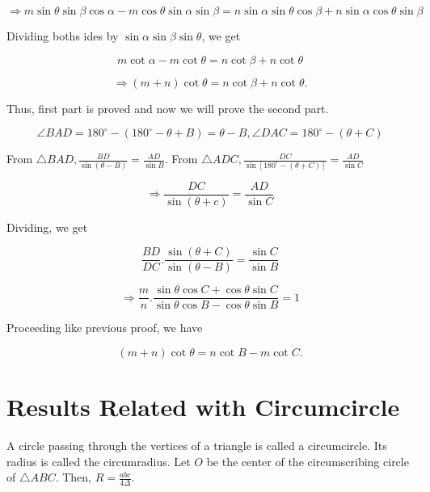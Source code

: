   $$\Rightarrow m\sin\theta\sin\beta\cos\alpha - m\cos\theta\sin\alpha\sin\beta = n\sin\alpha\sin\theta\cos\beta +
  n\sin\alpha\cos\theta\sin\beta$$

  Dividing boths ides by $\sin\alpha\sin\beta\sin\theta$, we get

  $$m\cot\alpha - m\cot\theta = n\cot\beta + n\cot\theta$$

  $$\Rightarrow (m + n)\cot\theta = n\cot\beta + n\cot\theta.$$

  \noindent Thus, first part is proved and now we will prove the second part.

  $$\angle BAD = 180^\circ - (180^\circ - \theta + B) = \theta - B, \angle DAC = 180^\circ - (\theta + C)$$

  From $\triangle BAD, \frac{BD}{\sin(\theta - B)} = \frac{AD}{\sin B}$. From $\triangle ADC, \frac{DC}{\sin[180^\circ - (\theta +
      C)]} = \frac{AD}{\sin C}$

  $$\Rightarrow \frac{DC}{\sin(\theta + c)} = \frac{AD}{\sin C}$$

  Dividing, we get

  $$\frac{BD}{DC}.\frac{\sin(\theta + C)}{\sin(\theta - B)} = \frac{\sin C}{\sin B}$$

  $$\Rightarrow \frac{m}{n}.\frac{\sin\theta\cos C + \cos\theta\sin C}{\sin\theta\cos B - \cos\theta\sin B} = 1$$

  Proceeding like previous proof, we have

  $$(m + n)\cot\theta = n\cot B - m\cot C.$$
\stopproof

\section{Results Related with Circumcircle}
A circle passing through the vertices of a triangle is called a circumcircle. Its radius is called the circumradius.
\starttheorem
  Let $O$ be the center of the circumscribing circle of $\triangle ABC$. Then, $R = \frac{abc}{4\Delta}$.
\stoptheorem

